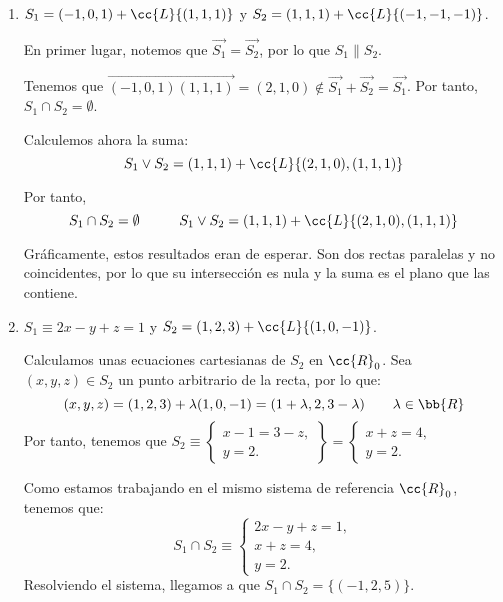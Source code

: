\begin{ejercicio}
\begin{enumerate}
        \item $S_1=(-1,0,1)+\cc{L}\{(1,1,1)\}$ y $S_2=(1,1,1)+\cc{L}\{(-1,-1,-1)\}$.

        En primer lugar, notemos que $\vec{S_1}=\vec{S_2}$, por lo que $S_1\|S_2$.
        
        Tenemos que $\vec{(-1,0,1)(1,1,1)}=(2,1,0)\notin \vec{S_1}+\vec{S_2}=\vec{S_1}$. Por tanto, $S_1\cap S_2=\emptyset$.

        Calculemos ahora la suma:
        \begin{equation*}
            S_1\vee S_2 = (1,1,1) + \cc{L}\{(2,1,0),(1,1,1)\}
        \end{equation*}

        Por tanto,
        \begin{equation*}
            S_1\cap S_2 = \emptyset \hspace{1cm} S_1\vee S_2 = (1,1,1) + \cc{L}\{(2,1,0),(1,1,1)\}
        \end{equation*}

        Gráficamente, estos resultados eran de esperar. Son dos rectas paralelas y no coincidentes, por lo que su intersección es nula y la suma es el plano que las contiene.
        
        \item $S_1\equiv 2x-y+z=1$ y $S_2=(1,2,3)+\cc{L}\{(1,0,-1)\}$.

        Calculamos unas ecuaciones cartesianas de $S_2$ en $\cc{R}_0$. Sea $(x,y,z)\in S_2$ un punto arbitrario de la recta, por lo que:
        \begin{equation*}
            (x,y,z)=(1,2,3) + \lambda(1,0,-1) = (1+\lambda, 2, 3-\lambda) \qquad \lambda\in \bb{R}
        \end{equation*}
        Por tanto, tenemos que $S_2\equiv \left\{\begin{array}{l}
            x-1=3-z, \\
            y=2.
        \end{array}\right\} = \left\{\begin{array}{l}
            x+z=4, \\
            y=2.
        \end{array}\right.$

        Como estamos trabajando en el mismo sistema de referencia $\cc{R}_0$, tenemos que:
        \begin{equation*}
            S_1\cap S_2 \equiv \left\{\begin{array}{l}
            2x-y+z=1,\\
            x+z=4, \\
            y=2.
        \end{array}\right. 
        \end{equation*}
        Resolviendo el sistema, llegamos a que $S_1\cap S_2 = \{(-1,2,5)\}$.


\end{enumerate}
\end{ejercicio}
